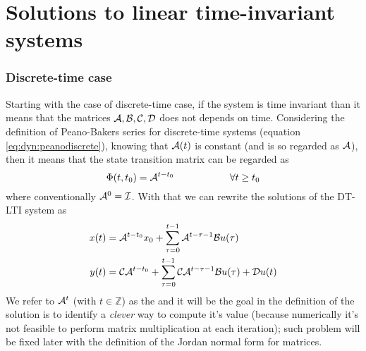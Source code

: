 \section{Solutions to linear time-invariant systems}
	\subsubsection*{Discrete-time case}
	Starting with the case of discrete-time case, if the system is time invariant than it means that the matrices $\mathcal{A},\mathcal{B},\mathcal{C},\mathcal{D}$ does not depends on time. Considering the definition of Peano-Bakers series for discrete-time systems (equation \ref{eq:dyn:peanodiscrete}), knowing that $\mathcal{A}(t)$ is constant (and is so regarded as $\mathcal{A}$), then it means that the state transition matrix can be regarded as
	\begin{equation}
		\Phi(t,t_0) = \mathcal{A}^{t-t_0} \hspace{2cm} \forall t\geq t_0
	\end{equation}
	where conventionally $\mathcal{A}^0 = \mathcal{I}$. With that we can rewrite the solutions of the DT-LTI system as
	\begin{equation}
	\begin{split}
		x(t) & = \mathcal{A}^{t-t_0} x_0 +  \sum_{\tau=0}^{t-1} \mathcal{A}^{t-\tau-1} \mathcal{B} u(\tau) \\
		y(t) & = \mathcal{C} \mathcal{A}^{t-t_0} + \sum_{\tau=0}^{t-1} \mathcal{C} \mathcal{A}^{t-\tau -1} \mathcal{B} u(\tau) + \mathcal{D} u(t)
	\end{split}
	\end{equation}
	We refer to $\mathcal{A}^t$ (with $t\in \mathds Z$) as the  and it will be the goal in the definition of the solution is to identify a \textit{clever} way to compute it's value (because numerically it's not feasible to perform matrix multiplication at each iteration); such problem will be fixed later with the definition of the Jordan normal form for matrices.
	
